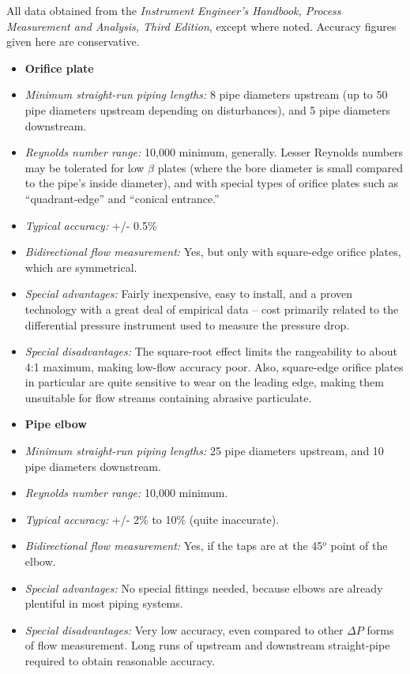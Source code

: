
All data obtained from the {\it Instrument Engineer's Handbook, Process Measurement and Analysis, Third Edition}, except where noted.  Accuracy figures given here are conservative.


\vskip 10pt


\begin{itemize}
\goodbreak
\item{} {\bf Orifice plate}
\item{} {\it Minimum straight-run piping lengths:} 8 pipe diameters upstream (up to 50 pipe diameters upstream depending on disturbances), and 5 pipe diameters downstream.
\item{} {\it Reynolds number range:} 10,000 minimum, generally.  Lesser Reynolds numbers may be tolerated for low $\beta$ plates (where the bore diameter is small compared to the pipe's inside diameter), and with special types of orifice plates such as ``quadrant-edge'' and ``conical entrance.''
\item{} {\it Typical accuracy:} +/- 0.5\%
\item{} {\it Bidirectional flow measurement:} Yes, but only with square-edge orifice plates, which are symmetrical.
\item{} {\it Special advantages:} Fairly inexpensive, easy to install, and a proven technology with a great deal of empirical data -- cost primarily related to the differential pressure instrument used to measure the pressure drop.
\item{} {\it Special disadvantages:} The square-root effect limits the rangeability to about 4:1 maximum, making low-flow accuracy poor.  Also, square-edge orifice plates in particular are quite sensitive to wear on the leading edge, making them unsuitable for flow streams containing abrasive particulate.
\end{itemize}


\vskip 10pt


\begin{itemize}
\goodbreak
\item{} {\bf Pipe elbow}
\item{} {\it Minimum straight-run piping lengths:} 25 pipe diameters upstream, and 10 pipe diameters downstream.
\item{} {\it Reynolds number range:} 10,000 minimum.
\item{} {\it Typical accuracy:} +/- 2\% to 10\% (quite inaccurate).
\item{} {\it Bidirectional flow measurement:} Yes, if the taps are at the 45$^{o}$ point of the elbow.
\item{} {\it Special advantages:} No special fittings needed, because elbows are already plentiful in most piping systems.
\item{} {\it Special disadvantages:} Very low accuracy, even compared to other $\Delta P$ forms of flow measurement.  Long runs of upstream and downstream straight-pipe required to obtain reasonable accuracy.
\end{itemize}


